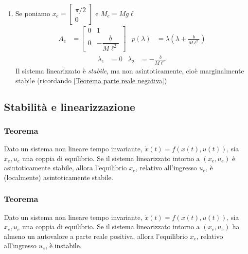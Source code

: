 \documentclass{article}
\numberwithin{equation}{subsection}
\let\oldsubsection\subsection%
\renewcommand{\subsection}{%
  \renewcommand{\theequation}{\thesubsection.\arabic{equation}}%
  \oldsubsection}%
\begin{document}
\begin{enumerate}
    \item 
    Se poniamo $x_e = \begin{bmatrix} \pi/2\\ 0 \end{bmatrix}$ e $M_e = Mg\ell$
    \begin{align*}
        A_e &= \begin{bmatrix} 0&1\\ 0&-\dfrac{b}{M \ell^2} \end{bmatrix} & p(\lambda) &= \lambda \left( \lambda + \frac{b} {M\ell^2} \right)
    \end{align*}
    \begin{align*}
        \lambda_1 &= 0 & \lambda_2&=-\frac{b}{M\ell^2}
    \end{align*}
    Il sistema linearizzato è \textit{stabile}, ma non asintoticamente, cioè marginalmente stabile (ricordando \ref{Teorema parte reale negativa})
\end{enumerate}



\subsection{Stabilità e linearizzazione}
\subsubsection*{Teorema}
Dato un sistema non lineare tempo invariante, $\dot x(t)=f(x(t),u(t))$, sia $x_e,u_e$ una coppia di equilibrio. Se il sistema linearizzato intorno a $(x_e,u_e)$ è asintoticamente stabile, allora l'equilibrio $x_e$, relativo all'ingresso $u_e$, è (localmente) asintoticamente stabile.

\subsubsection*{Teorema}
Dato un sistema non lineare tempo invariante, $\dot x(t)=f(x(t),u(t))$, sia $x_e,u_e$ una coppia di equilibrio. Se il sistema linearizzato intorno a $(x_e,u_e)$ ha almeno un autovalore a parte reale positiva, allora l'equilibrio $x_e$, relativo all'ingresso $u_e$, è instabile.
\end{document}
